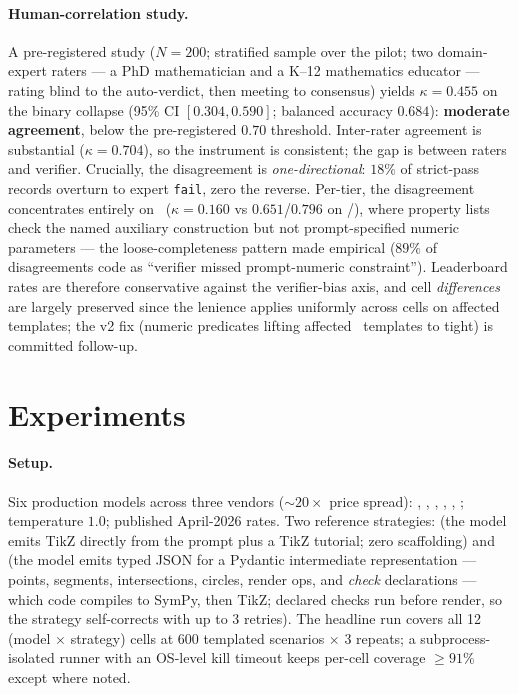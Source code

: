 \documentclass{article}
\begin{document}
\paragraph{Human-correlation study.}
A pre-registered study ($N{=}200$; stratified sample over the pilot; two domain-expert raters --- a PhD mathematician and a K--12 mathematics educator --- rating blind to the auto-verdict, then meeting to consensus) yields $\kappa = 0.455$ on the binary collapse (95\% CI $[0.304, 0.590]$; balanced accuracy $0.684$): \textbf{moderate agreement}, below the pre-registered $0.70$ threshold.
Inter-rater agreement is substantial ($\kappa = 0.704$), so the instrument is consistent; the gap is between raters and verifier.
Crucially, the disagreement is \emph{one-directional}: $18\%$ of strict-pass records overturn to expert \texttt{fail}, zero the reverse.
Per-tier, the disagreement concentrates entirely on \ttwo\ ($\kappa = 0.160$ vs $0.651$/$0.796$ on \tone/\tthree), where property lists check the named auxiliary construction but not prompt-specified numeric parameters --- the loose-completeness pattern made empirical ($89\%$ of disagreements code as ``verifier missed prompt-numeric constraint'').
Leaderboard rates are therefore conservative against the verifier-bias axis, and cell \emph{differences} are largely preserved since the lenience applies uniformly across cells on affected templates; the v2 fix (numeric predicates lifting affected \ttwo\ templates to tight) is committed follow-up.

\section{Experiments}
\label{sec:results}

\paragraph{Setup.}
Six production models across three vendors ($\sim$$20\times$ price spread): \opus, \sonnet, \haiku, \gpt, \geminipro, \geminiflash; temperature $1.0$; published April-2026 rates.
Two reference strategies: \textbf{\rawcode} (the model emits TikZ directly from the prompt plus a TikZ tutorial; zero scaffolding) and \textbf{\structured} (the model emits typed JSON for a Pydantic intermediate representation --- points, segments, intersections, circles, render ops, and \emph{check} declarations --- which code compiles to SymPy, then TikZ; declared checks run before render, so the strategy self-corrects with up to 3 retries).
The headline run covers all 12 (model $\times$ strategy) cells at 600 templated scenarios $\times$ 3 repeats; a subprocess-isolated runner with an OS-level kill timeout keeps per-cell coverage $\geq 91\%$ except where noted.
\end{document}
